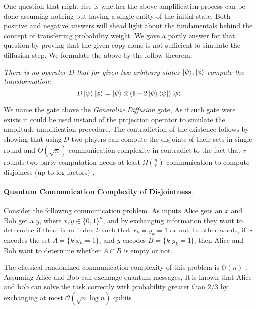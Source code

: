 \documentclass{article}
\newcommand{\commentt}[1]{\textcolor{blue}{ \textbf{[COMMENT]} #1}}
\newcommand{\ctt}[1]{\commentt{#1}}
\newcommand{\onotation}[1]{\(\mathcal{O} \left( {#1}  \right) \)}
\newcommand{\ona}[1]{\onotation{#1}}
\begin{document}
  One question that might rise is whether the above amplification process can be done assuming nothing but having a single entity of the initial state. Both positive and negative answers will shead light about the fundamentals behind the concept of transferring probability weight. We gave a partly answer for that question by proving that the given copy alone is not sufficient to simulate the diffusion step. We formulate the above by the follow theorem: 

  \begin{theorem} \textit{ There is no operator $D$ that for given two arbitrary states $\ket{\psi},\ket{\phi}$ compute the transformation:} 
\begin{equation*}
    D \ket{\psi}\ket{\phi} = \ket{\psi}\otimes\left( \mathbb{I} - 2 \ket{\psi}\bra{\psi} \right)\ket{\phi} 
\end{equation*}
\end{theorem}

We name the gate above the \textit{Generalize Diffusion} gate, As if such gate were exists it could be used instand of the projection operator to simulate the amplitude amplification procedure. The contradiction of the existence follows by showing that using $D$ two players can compute the disjoints of their sets in single round and $O\left( \sqrt{n} \right)$ communication complexity in contradict to the fact that $r$-rounds two party computation needs at least $\Omega\left( \frac{n}{r} \right)$ communication to compute disjoiness (up to log factors) \cite{Braverman}.    

\paragraph{Quantum Communication Complexity of Disjointness.}
Consider the following communication problem.
As inputs Alice gets an \(x\) and Bob get a \(y\), where \(x, y \in \{0, 1\}^n \), and by exchanging information they want to determine if there is an index \(k\) such that \(x_k = y_k = 1 \) or not. 
In other words, if \(x\) encodes the set \(A = \{k | x_k = 1\} \), and \(y\) encodes \(B = \{k | y_k = 1\}\), 
then Alice and Bob want to determine whether \( A \cap B \) is empty or not.

The classical randomized communication complexity of this problem is \ona{n} \cite{v003a011}.
Assuming Alice and Bob can exchange quantum messages, It is known that Alice and bob can solve the task
correctly with probability greater than \(2/3\) by exchanging at most \ona{\sqrt{n}\log n } qubits %
\end{document}
